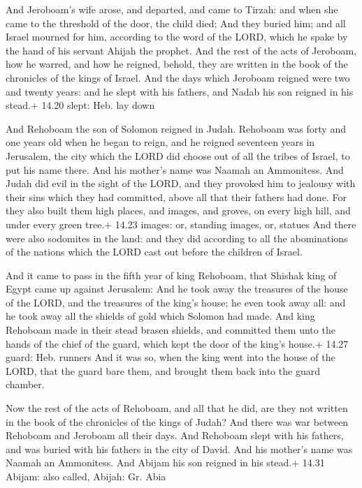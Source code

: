  And Jeroboam's wife arose, and departed, and came to
Tirzah: and when she came to the threshold of the door, the child died;
 And they buried him; and all Israel mourned for him,
according to the word of the LORD, which he spake by the hand of his
servant Ahijah the prophet.  And the rest of the acts of
Jeroboam, how he warred, and how he reigned, behold, they are written in
the book of the chronicles of the kings of Israel.  And the
days which Jeroboam reigned were two and twenty years: and he slept with
his fathers, and Nadab his son reigned in his stead.+ 14.20 slept: Heb.
lay down

 And Rehoboam the son of Solomon reigned in Judah.
Rehoboam was forty and one years old when he began to reign, and he
reigned seventeen years in Jerusalem, the city which the LORD did choose
out of all the tribes of Israel, to put his name there. And his mother's
name was Naamah an Ammonitess.  And Judah did evil in the
sight of the LORD, and they provoked him to jealousy with their sins
which they had committed, above all that their fathers had done.
 For they also built them high places, and images, and
groves, on every high hill, and under every green tree.+ 14.23 images:
or, standing images, or, statues  And there were also
sodomites in the land: and they did according to all the abominations of
the nations which the LORD cast out before the children of Israel.

 And it came to pass in the fifth year of king Rehoboam,
that Shishak king of Egypt came up against Jerusalem:  And
he took away the treasures of the house of the LORD, and the treasures
of the king's house; he even took away all: and he took away all the
shields of gold which Solomon had made.  And king Rehoboam
made in their stead brasen shields, and committed them unto the hands of
the chief of the guard, which kept the door of the king's house.+ 14.27
guard: Heb. runners  And it was so, when the king went into
the house of the LORD, that the guard bare them, and brought them back
into the guard chamber.

 Now the rest of the acts of Rehoboam, and all that he
did, are they not written in the book of the chronicles of the kings of
Judah?  And there was war between Rehoboam and Jeroboam all
their days.  And Rehoboam slept with his fathers, and was
buried with his fathers in the city of David. And his mother's name was
Naamah an Ammonitess. And Abijam his son reigned in his stead.+ 14.31
Abijam: also called, Abijah: Gr. Abia

